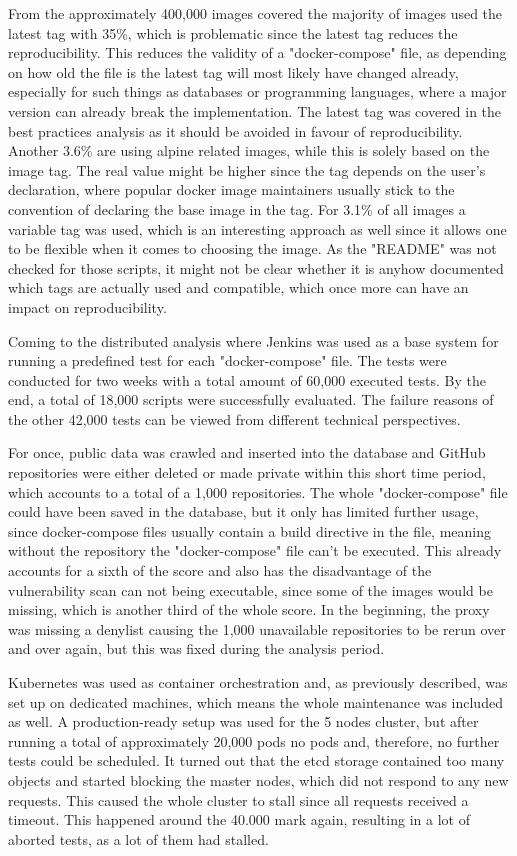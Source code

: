From the approximately 400,000 images covered the majority of images used the latest tag with 35\%, which is problematic since the latest tag reduces the reproducibility. This reduces the validity of a "docker-compose" file, as depending on how old the file is the latest tag will most likely have changed already, especially for such things as databases or programming languages, where a major version can already break the implementation. The latest tag was covered in the best practices analysis as it should be avoided in favour of reproducibility.
Another 3.6\% are using alpine related images, while this is solely based on the image tag. The real value might be higher since the tag depends on the user's declaration, where popular docker image maintainers usually stick to the convention of declaring the base image in the tag.
For 3.1\% of all images a variable tag was used, which is an interesting approach as well since it allows one to be flexible when it comes to choosing the image. As the "README" was not checked for those scripts, it might not be clear whether it is anyhow documented which tags are actually used and compatible, which once more can have an impact on reproducibility.

Coming to the distributed analysis where Jenkins was used as a base system for running a predefined test for each "docker-compose" file. The tests were conducted for two weeks with a total amount of 60,000 executed tests. By the end, a total of 18,000 scripts were successfully evaluated. The failure reasons of the other 42,000 tests can be viewed from different technical perspectives.

For once, public data was crawled and inserted into the database and GitHub repositories were either deleted or made private within this short time period, which accounts to a total of a 1,000 repositories. The whole "docker-compose" file could have been saved in the database, but it only has limited further usage, since docker-compose files usually contain a build directive in the file, meaning without the repository the "docker-compose" file can't be executed. This already accounts for a sixth of the score and also has the disadvantage of the vulnerability scan can not being executable, since some of the images would be missing, which is another third of the whole score. In the beginning, the proxy was missing a denylist causing the 1,000 unavailable repositories to be rerun over and over again, but this was fixed during the analysis period.

Kubernetes was used as container orchestration and, as previously described, was set up on dedicated machines, which means the whole maintenance was included as well. A production-ready setup was used for the 5 nodes cluster, but after running a total of approximately 20,000 pods no pods and, therefore, no further tests could be scheduled. It turned out that the etcd storage contained too many objects and started blocking the master nodes, which did not respond to any new requests. This caused the whole cluster to stall since all requests received a timeout. This happened around the 40.000 mark again, resulting in a lot of aborted tests, as a lot of them had stalled.

